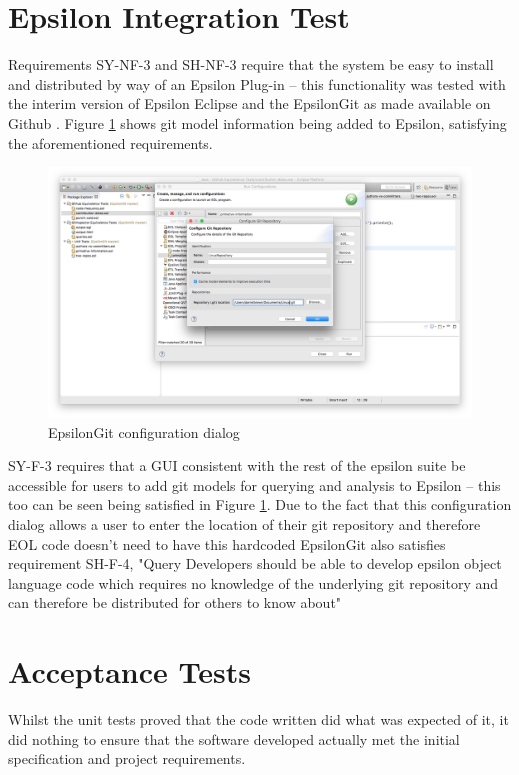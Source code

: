 \documentclass[11pt]{book}
\begin{document}
\section{Epsilon Integration Test}
\label{evalepsilonintegration}
Requirements SY-NF-3 and SH-NF-3 require that the system be easy to install and distributed by way of an Epsilon Plug-in -- this functionality was tested with the interim version of Epsilon Eclipse and the EpsilonGit as made available on Github \cite{epsilongitgithub}. Figure \ref{fig:epsilonintegration} shows git model information being added to Epsilon, satisfying the aforementioned requirements.

\begin{figure}[h]
	\centering
	\includegraphics[width=\textwidth]{images/epsilonintegration}
	\caption{EpsilonGit configuration dialog}
	\label{fig:epsilonintegration}
\end{figure}

SY-F-3 requires that a GUI consistent with the rest of the epsilon suite be accessible for users to add git models for querying and analysis to Epsilon -- this too can be seen being satisfied in Figure \ref{fig:epsilonintegration}. Due to the fact that this configuration dialog allows a user to enter the location of their git repository and therefore EOL code doesn't need to have this hardcoded EpsilonGit also satisfies requirement SH-F-4, "Query Developers should be able to develop epsilon object language code which requires no knowledge of the underlying git repository and can therefore be distributed for others to know about"

\section{Acceptance Tests}
\label{evalacceptance}
Whilst the unit tests proved that the code written did what was expected of it, it did nothing to ensure that the software developed actually met the initial specification and project requirements.
\end{document}
